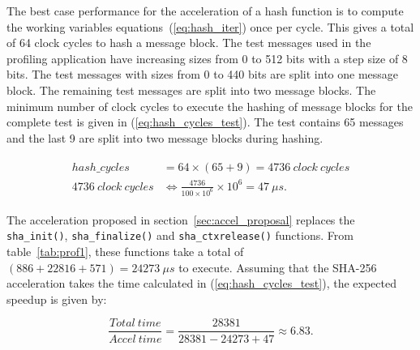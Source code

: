 The best case performance for the acceleration of a hash function is to compute
the working variables equations~(\ref{eq:hash_iter}) once per cycle. This gives
a total of 64 clock cycles to hash a message block. 
The test messages used in the profiling application have increasing sizes from
0 to 512 bits with a step size of 8 bits. The test messages with sizes from 0
to 440 bits are split into one message block. The remaining test messages are
split into two message blocks. 
The minimum number of clock cycles to execute the hashing of message blocks for
the complete test is given in (\ref{eq:hash_cycles_test}). The test contains 65
messages and the last 9 are split into two message blocks during hashing.

\begin{align}
    \begin{split}
    hash\_cycles &= 64 \times ( 65 + 9 ) = 4736 \ clock \ cycles \\
    4736 \ clock \ cycles &\Leftrightarrow \frac{4736}{100\times 10^{6}}\times 10^{6} = 47 \ \mu s.
    \end{split}
\label{eq:hash_cycles_test}
\end{align}

The acceleration proposed in section~\ref{sec:accel_proposal} replaces the 
\texttt{sha\_init()}, \texttt{sha\_finalize()} and \texttt{sha\_ctxrelease()} 
functions. From table~\ref{tab:prof1}, these functions take a total of 
$ (886 + 22816 + 571) = 24273 \ \mu s$ to execute. Assuming that the SHA-256
acceleration takes the time calculated in (\ref{eq:hash_cycles_test}), the
expected speedup is given by:

\begin{equation}
    \frac{Total\ time}{Accel\ time} = \frac{28381}{28381 - 24273 + 47} \approx 6.83.
\label{eq:expected_speedup}
\end{equation}

